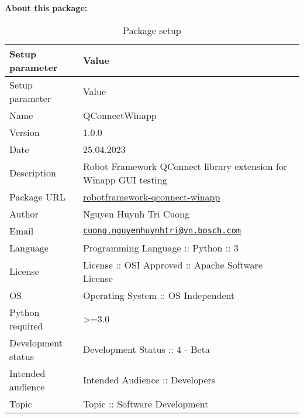 %
%

\textbf{About this package:}

\begin{longtable}[]{@{}ll@{}}
\caption{Package setup}\tabularnewline
\toprule()
Setup parameter & Value \\
\midrule()
\endfirsthead
\toprule()
Setup parameter & Value \\
\midrule()
\endhead
Name & QConnectWinapp \\
Version & 1.0.0 \\
Date & 25.04.2023 \\
Description & Robot Framework QConnect library extension for Winapp GUI
testing \\
Package URL &
\href{https://sourcecode.socialcoding.bosch.com/projects/ROBFW/repos/robotframework-qconnect-dlt/browse}{robotframework-qconnect-winapp} \\
Author & Nguyen Huynh Tri Cuong \\
Email &
\href{mailto:cuong.nguyenhuynhtri@vn.bosch.com}{\nolinkurl{cuong.nguyenhuynhtri@vn.bosch.com}} \\
Language & Programming Language :: Python :: 3 \\
License & License :: OSI Approved :: Apache Software License \\
OS & Operating System :: OS Independent \\
Python required & \textgreater=3.0 \\
Development status & Development Status :: 4 - Beta \\
Intended audience & Intended Audience :: Developers \\
Topic & Topic :: Software Development \\
\bottomrule()
\end{longtable}
